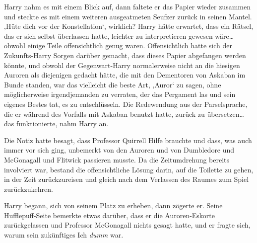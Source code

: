 Harry nahm es mit einem Blick auf, dann faltete er das Papier wieder zusammen und steckte es mit einem weiteren ausgeatmeten Seufzer zurück in seinen Mantel.
‚Hüte dich vor der Konstellation‘, wirklich? Harry hätte erwartet, dass ein Rätsel, das er sich selbst überlassen hatte, leichter zu interpretieren gewesen wäre… obwohl einige Teile offensichtlich genug waren. Offensichtlich hatte sich der Zukunfts-Harry Sorgen darüber gemacht, dass dieses Papier abgefangen werden könnte, und obwohl der Gegenwart-Harry normalerweise nicht an die hiesigen Auroren als diejenigen gedacht hätte, die mit den Dementoren von Askaban im Bunde standen, war das vielleicht die beste Art, ‚Auror‘ zu sagen, ohne möglicherweise irgendjemanden zu verraten, der das Pergament las und sein eigenes Bestes tat, es zu entschlüsseln.
Die Redewendung aus der Parselsprache, die er während des Vorfalls mit Askaban benutzt hatte, zurück zu übersetzen… das funktionierte, nahm Harry an.

Die Notiz hatte besagt, dass Professor Quirrell Hilfe brauchte und dass, was auch immer vor sich ging, unbemerkt von den Auroren und von Dumbledore und McGonagall und Flitwick passieren musste. Da die Zeitumdrehung bereits involviert war, bestand die offensichtliche Lösung darin, auf die Toilette zu gehen, in der Zeit zurückzureisen und gleich nach dem Verlassen des Raumes zum Spiel zurückzukehren.

Harry begann, sich von seinem Platz zu erheben, dann zögerte er.
Seine Hufflepuff-Seite bemerkte etwas darüber, dass er die Auroren-Eskorte zurückgelassen und Professor McGonagall nichts gesagt hatte, und er fragte sich, warum sein zukünftiges Ich \emph{dumm} war.

